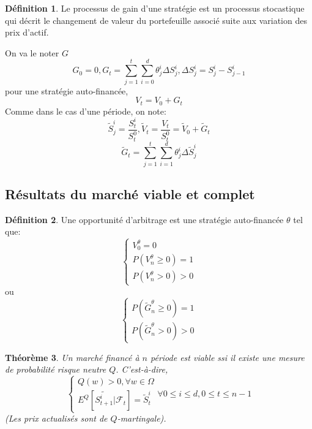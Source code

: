 \documentclass{article}
\theoremstyle{plain}
\newtheorem{thm}{Th\'eor\`eme}[section]
\theoremstyle{definition}
\newtheorem{defn}[thm]{D\'efinition}
\begin{document}
\begin{defn}
	Le processus de gain d'une strat\'egie est un processus stocastique qui d\'ecrit le changement de valeur du portefeuille associ\'e suite aux variation des prix d'actif.

\end{defn}

On va le noter $G$
\begin{equation}
G_0=0,G_t=\sum_{j=1}^t\sum_{i=0}^d \theta_j^i\Delta S_j^i,\Delta S_j^i=S_j^i-S_{j-1}^i
\end{equation}
pour une strat\'egie auto-financ\'ee,
\begin{equation}
V_t=V_0+G_t
\end{equation}
Comme dans le cas d'une p\'eriode, on note:
\begin{equation}
\tilde{S}_j^i=\frac{S_t^i}{S_t^0},\tilde{V}_t=\frac{V_t}{S_t^0}=\tilde{V}_0+\tilde{G}_t
\end{equation}
\begin{equation}
\tilde{G}_t=\sum_{j=1}^t\sum_{i=1}^d \theta_j^i \Delta \tilde{S}_j^i
\end{equation}

\subsection{R\'esultats du march\'e viable et complet}

\begin{defn}
	Une opportunit\'e d'arbitrage est une strat\'egie auto-financ\'ee $\theta$ tel que:
\begin{equation}
\left\{\begin{array}{l}
V_0^\theta=0 \\
P(V_n^\theta \geq 0)=1\\ 
P(V_n^\theta >0)>0
\end{array}\right.
\end{equation}
ou
\begin{equation}
\left\{\begin{array}{rcl}
P(\tilde{G}_n^\theta \geq 0)=1\\
P(\tilde{G}_n^\theta>0)>0
\end{array}\right.
\end{equation}
\end{defn}

\begin{thm}
	Un march\'e financ\'e \`a $n$ p\'eriode est viable ssi il existe une mesure de probabilit\'e risque neutre $Q$. C'est-\`a-dire,
\begin{equation}
\left\{\begin{array}{l}
Q(w)>0,\forall w\in\Omega\\
E^Q[\tilde{S_{t+1}^i}|\mathcal{F}_t]=\tilde{S}_t^i
\end{array}\right.
\forall 0 \leq i \leq d,0\leq t\leq n-1
\end{equation}
(Les prix actualis\'es sont de $Q$-martingale).
\end{thm}
\end{document}

